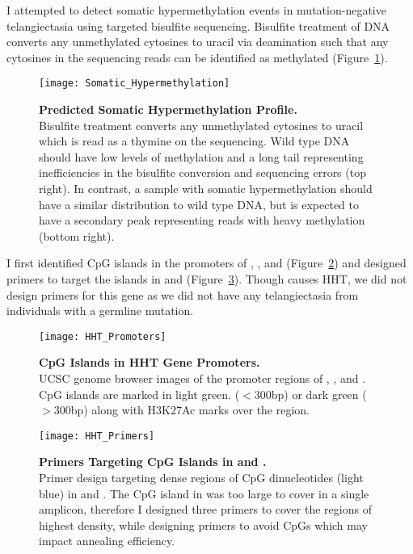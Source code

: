 I attempted to detect somatic hypermethylation events in mutation-negative telangiectasia using targeted bisulfite sequencing. Bisulfite treatment of DNA converts any unmethylated cytosines to uracil via deamination such that any cytosines in the sequencing reads can be identified as methylated (Figure~\ref{Somatic_Hypermethylation}). 
\begin{figure}[tbp!]
\begin{center}
\texttt{[image: Somatic\_Hypermethylation]}
\end{center}
\caption[Predicted Somatic Hypermethylation Profile]{\textbf{Predicted Somatic Hypermethylation Profile.} \\ Bisulfite treatment converts any unmethylated cytosines to uracil which is read as a thymine on the sequencing. Wild type DNA should have low levels of methylation and a long tail representing inefficiencies in the bisulfite conversion and sequencing errors (top right). In contrast, a sample with somatic hypermethylation should have a similar distribution to wild type DNA, but is expected to have a secondary peak representing reads with heavy methylation (bottom right).}
\label{Somatic_Hypermethylation}
\end{figure}
I first identified CpG islands in the promoters of , , and  (Figure~\ref{HHT_Promoters}) and designed primers to target the islands in  and  (Figure~\ref{HHT_Primers}). Though  causes HHT, we did not design primers for this gene as we did not have any telangiectasia from individuals with a  germline mutation.
\begin{figure}[tbp!]
\begin{center}
\texttt{[image: HHT\_Promoters]}
\end{center}
\caption[CpG Islands in HHT Gene Promoters]{\textbf{CpG Islands in HHT Gene Promoters.} \\ UCSC genome browser images of the promoter regions of , , and . CpG islands are marked in light green. ($<$300bp) or dark green ($>$300bp) along with H3K27Ac marks over the region.}
\label{HHT_Promoters}
\end{figure}
\begin{figure}[tbp!]
\begin{center}
\texttt{[image: HHT\_Primers]}
\end{center}
\caption[Primers Targeting CpG Islands in  and ]{\textbf{Primers Targeting CpG Islands in  and .} \\ Primer design targeting dense regions of CpG dinucleotides (light blue) in  and . The CpG island in  was too large to cover in a single amplicon, therefore I designed three primers to cover the regions of highest density, while designing primers to avoid CpGs which may impact annealing efficiency. }
\label{HHT_Primers}
\end{figure}
